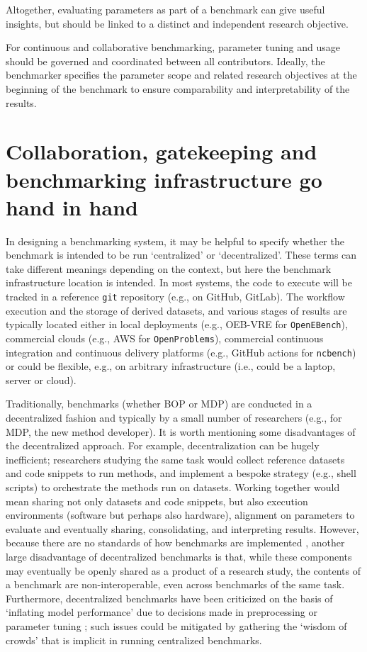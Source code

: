 \documentclass[11pt]{article}
\begin{document}
Altogether, evaluating parameters as part of a benchmark can give useful insights, but should be linked to a distinct and independent research objective.

For continuous and collaborative benchmarking, parameter tuning and usage should be governed and coordinated between all contributors. Ideally, the benchmarker specifies the parameter scope and related research objectives at the beginning of the benchmark to ensure comparability and interpretability of the results. 

\section*{Collaboration, gatekeeping and benchmarking infrastructure go hand in hand}

In designing a benchmarking system, it may be helpful to specify whether the benchmark is intended to be run `centralized' or `decentralized'. These terms can take different meanings depending on the context, but here the benchmark infrastructure location is intended. In most systems, the code to execute will be tracked in a reference \texttt{git} repository (e.g., on GitHub, GitLab). The workflow execution and the storage of derived datasets, and various stages of results are typically located either in local deployments (e.g., OEB-VRE for \texttt{OpenEBench}), commercial clouds (e.g., AWS for \texttt{OpenProblems}), commercial continuous integration and continuous delivery platforms (e.g., GitHub actions for \texttt{ncbench}) or could be flexible, e.g., on arbitrary infrastructure (i.e., could be a laptop, server or cloud). 

Traditionally, benchmarks (whether BOP or MDP) are conducted in a decentralized fashion and typically by a small number of researchers (e.g., for MDP, the new method developer). It is worth mentioning some disadvantages of the decentralized approach. For example, decentralization can be hugely inefficient; researchers studying the same task would collect reference datasets and code snippets to run methods, and implement a bespoke strategy (e.g., shell scripts) to orchestrate the methods run on datasets. Working together would mean sharing not only datasets and code snippets, but also execution environments (software but perhaps also hardware), alignment on parameters to evaluate and eventually sharing, consolidating, and interpreting results. However, because there are no standards of how benchmarks are implemented \cite{Sonrel2023-te}, another large disadvantage of decentralized benchmarks is that, while these components may eventually be openly shared as a product of a research study, the contents of a benchmark are non-interoperable, even across benchmarks of the same task. Furthermore, decentralized benchmarks have been criticized on the basis of `inflating model performance' due to decisions made in preprocessing or parameter tuning \cite{Luecken2024-fk}; such issues could be mitigated by gathering the `wisdom of crowds' that is implicit in running centralized benchmarks.
\end{document}
